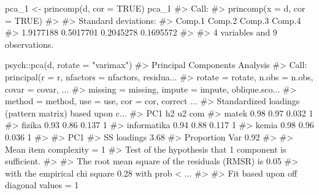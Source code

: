 \documentclass[
  letterpaper,
]{krantz}
\makeatletter
\newenvironment{Shaded}{\begin{snugshade}}{\end{snugshade}}
\newcommand{\AttributeTok}[1]{\textcolor[rgb]{0.40,0.45,0.13}{#1}}
\newcommand{\CommentTok}[1]{\textcolor[rgb]{0.37,0.37,0.37}{#1}}
\newcommand{\ConstantTok}[1]{\textcolor[rgb]{0.56,0.35,0.01}{#1}}
\newcommand{\FunctionTok}[1]{\textcolor[rgb]{0.28,0.35,0.67}{#1}}
\newcommand{\NormalTok}[1]{\textcolor[rgb]{0.00,0.23,0.31}{#1}}
\newcommand{\OtherTok}[1]{\textcolor[rgb]{0.00,0.23,0.31}{#1}}
\newcommand{\SpecialCharTok}[1]{\textcolor[rgb]{0.37,0.37,0.37}{#1}}
\newcommand{\StringTok}[1]{\textcolor[rgb]{0.13,0.47,0.30}{#1}}
\newenvironment{kframe}{%
\medskip{}
\setlength{\fboxsep}{.8em}
 \def\at@end@of@kframe{}%
 \ifinner\ifhmode%
  \def\at@end@of@kframe{\end{minipage}}%
  \begin{minipage}{\columnwidth}%
 \fi\fi%
 \def\FrameCommand##1{\hskip\@totalleftmargin \hskip-\fboxsep
 \colorbox{shadecolor}{##1}\hskip-\fboxsep
     \hskip-\linewidth \hskip-\@totalleftmargin \hskip\columnwidth}%
 \MakeFramed {\advance\hsize-\width
   \@totalleftmargin\z@ \linewidth\hsize
   \@setminipage}}%
 {\par\unskip\endMakeFramed%
 \at@end@of@kframe}
\renewenvironment{Shaded}{\begin{kframe}}{\end{kframe}}
\makeatother
\begin{document}
\begin{Shaded}
\begin{Highlighting}[]
\NormalTok{pca\_1 }\OtherTok{\textless{}{-}} \FunctionTok{princomp}\NormalTok{(d, }\AttributeTok{cor =} \ConstantTok{TRUE}\NormalTok{)}
\NormalTok{pca\_1}
\CommentTok{\#\textgreater{} Call:}
\CommentTok{\#\textgreater{} princomp(x = d, cor = TRUE)}
\CommentTok{\#\textgreater{} }
\CommentTok{\#\textgreater{} Standard deviations:}
\CommentTok{\#\textgreater{}    Comp.1    Comp.2    Comp.3    Comp.4 }
\CommentTok{\#\textgreater{} 1.9177188 0.5017701 0.2045278 0.1695572 }
\CommentTok{\#\textgreater{} }
\CommentTok{\#\textgreater{}  4  variables and  9 observations.}
\end{Highlighting}
\end{Shaded}

\begin{Shaded}
\begin{Highlighting}[]
\NormalTok{psych}\SpecialCharTok{::}\FunctionTok{pca}\NormalTok{(d, }\AttributeTok{rotate =} \StringTok{"varimax"}\NormalTok{)}
\CommentTok{\#\textgreater{} Principal Components Analysis}
\CommentTok{\#\textgreater{} Call: principal(r = r, nfactors = nfactors, residua...}
\CommentTok{\#\textgreater{}     rotate = rotate, n.obs = n.obs, covar = covar, ...}
\CommentTok{\#\textgreater{}     missing = missing, impute = impute, oblique.sco...}
\CommentTok{\#\textgreater{}     method = method, use = use, cor = cor, correct ...}
\CommentTok{\#\textgreater{} Standardized loadings (pattern matrix) based upon c...}
\CommentTok{\#\textgreater{}              PC1   h2    u2 com}
\CommentTok{\#\textgreater{} matek       0.98 0.97 0.032   1}
\CommentTok{\#\textgreater{} fizika      0.93 0.86 0.137   1}
\CommentTok{\#\textgreater{} informatika 0.94 0.88 0.117   1}
\CommentTok{\#\textgreater{} kemia       0.98 0.96 0.036   1}
\CommentTok{\#\textgreater{} }
\CommentTok{\#\textgreater{}                 PC1}
\CommentTok{\#\textgreater{} SS loadings    3.68}
\CommentTok{\#\textgreater{} Proportion Var 0.92}
\CommentTok{\#\textgreater{} }
\CommentTok{\#\textgreater{} Mean item complexity =  1}
\CommentTok{\#\textgreater{} Test of the hypothesis that 1 component is sufficient.}
\CommentTok{\#\textgreater{} }
\CommentTok{\#\textgreater{} The root mean square of the residuals (RMSR) is  0.05 }
\CommentTok{\#\textgreater{}  with the empirical chi square  0.28  with prob \textless{}  ...}
\CommentTok{\#\textgreater{} }
\CommentTok{\#\textgreater{} Fit based upon off diagonal values = 1}
\end{Highlighting}
\end{Shaded}
\end{document}

